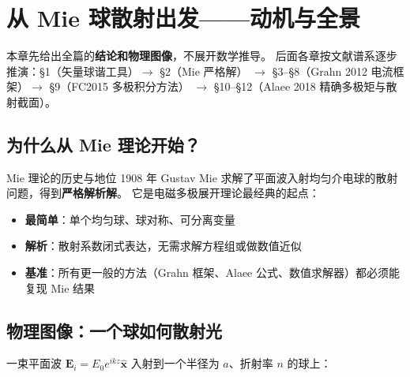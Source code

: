 \setcounter{section}{-1}
\section{从 Mie 球散射出发——动机与全景}

本章先给出全篇的\textbf{结论和物理图像}，不展开数学推导。
后面各章按文献谱系逐步推演：\S1（矢量球谐工具）$\to$ \S2（Mie 严格解）
$\to$ \S3--\S8（Grahn 2012 电流框架）$\to$ \S9（FC2015 多极积分方法）
$\to$ \S10--\S12（Alaee 2018 精确多极矩与散射截面）。

\subsection{为什么从 Mie 理论开始？}

\begin{stepbox}{Mie 理论的历史与地位}
1908 年 Gustav Mie 求解了平面波入射均匀介电球的散射问题，得到\textbf{严格解析解}。
它是电磁多极展开理论最经典的起点：
\begin{itemize}
  \item \textbf{最简单}：单个均匀球、球对称、可分离变量
  \item \textbf{解析}：散射系数闭式表达，无需求解方程组或做数值近似
  \item \textbf{基准}：所有更一般的方法（Grahn 框架、Alaee 公式、数值求解器）都必须能复现 Mie 结果
\end{itemize}
\end{stepbox}

\subsection{物理图像：一个球如何散射光}

一束平面波 $\mathbf{E}_i = E_0e^{ikz}\hat{\mathbf{x}}$ 入射到一个半径为 $a$、折射率 $n$ 的球上：

\begin{center}
\end{center}


